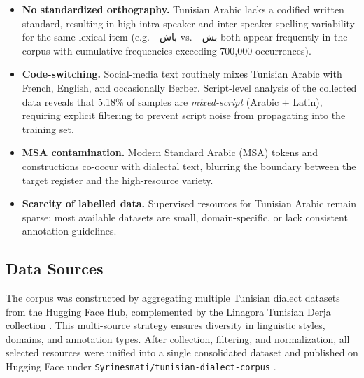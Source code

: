 \documentclass[12pt,a4paper]{report}
\newcommand{\ar}[1]{\textarabic{#1}} %
\begin{document}
\begin{itemize}
    \item \textbf{No standardized orthography.} Tunisian Arabic lacks a codified
          written standard, resulting in high intra-speaker and inter-speaker spelling
          variability for the same lexical item (e.g.\ \ \ar{باش} vs.\ \ \ar{بش} both appear
          frequently in the corpus with cumulative frequencies exceeding 700{,}000
          occurrences).

    \item \textbf{Code-switching.} Social-media text routinely mixes Tunisian Arabic
          with French, English, and occasionally Berber. Script-level analysis of the
          collected data reveals that 5.18\% of samples are \emph{mixed-script}
          (Arabic + Latin), requiring explicit filtering to prevent script noise from
          propagating into the training set.

    \item \textbf{MSA contamination.} Modern Standard Arabic (MSA) tokens and
          constructions co-occur with dialectal text, blurring the boundary between
          the target register and the high-resource variety.

    \item \textbf{Scarcity of labelled data.} Supervised resources for Tunisian Arabic
          remain sparse; most available datasets are small, domain-specific, or lack
          consistent annotation guidelines.
\end{itemize}

\subsection{Data Sources}

The corpus was constructed by aggregating multiple Tunisian dialect datasets
from the Hugging Face Hub, complemented by the Linagora Tunisian Derja
collection \citep{linagora2025LLM-tn}. This multi-source strategy ensures diversity in linguistic styles,
domains, and annotation types. After collection, filtering, and normalization,
all selected resources were unified into a single consolidated dataset and
published on Hugging Face under
\texttt{Syrinesmati/tunisian-dialect-corpus}
\citep{tunisian_dialect_corpus_cleaned_2026}.
\end{document}
